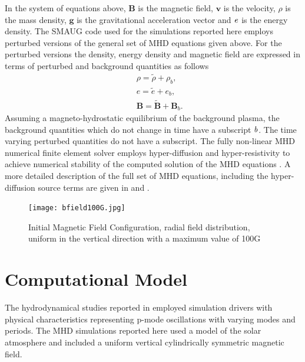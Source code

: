 \documentclass[linenumbers]{aastex63}
\begin{document}
In the system of equations above,  $\mathbf B$ is the magnetic field, $\mathbf v$ is the velocity, $\rho$ is the mass density, $\mathbf g$ is the gravitational acceleration vector  and  $\it{e}$ is the energy density. The SMAUG code used for the simulations reported here employs perturbed versions of the general set of MHD equations given above. For the perturbed versions the density,  energy density and magnetic field are expressed in terms of perturbed and background quantities as follows
\begin{eqnarray}
&& \rho = \tilde{\rho}+\rho_b, \nonumber \\
&& e = \tilde{e}+e_b,  \nonumber \\
&& {\mathbf B} = \tilde{\mathbf B}+{\mathbf B}_b.  \nonumber 
\end{eqnarray}
Assuming a magneto-hydrostatic equilibrium of the background plasma, the background quantities which do not change in time have a subscript $\it{b}$. The time varying perturbed quantities do not have a subscript. The fully non-linear MHD numerical finite element solver employs hyper-diffusion and hyper-resistivity to achieve numerical stability of the computed solution of the MHD equations \citet{Caunt2001}. A more detailed description of the full set of MHD equations, including the hyper-diffusion source terms are given in \citet{Griffiths2015} and \citet{Shelyag2008}.




\begin{figure}[h]\label{inimagfieldplot}
\centering
\texttt{[image: bfield100G.jpg]}
\caption{Initial Magnetic Field Configuration, radial field distribution, uniform in the vertical direction with a maximum value of 100G }
\end{figure}

\break

\section{Computational Model}




The hydrodynamical studies reported in  \citet{Griffiths2018b} employed simulation drivers with physical characteristics representing p-mode oscillations with varying modes and periods. The MHD simulations reported here  used a model of the solar atmosphere and included a uniform vertical cylindrically symmetric magnetic field.
\end{document}

